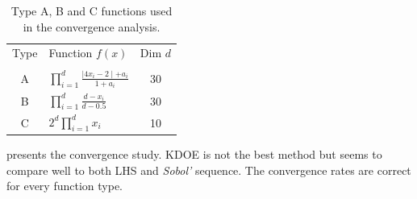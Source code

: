 \begin{table}[!ht]
\centering
\caption{Type A, B and C functions used in the convergence analysis.}
\begin{tabular}{clc}
\toprule
Type &  Function $f(x)$ & Dim $d$\\
 &   &  \\
\midrule %
A & $\displaystyle\prod_{i=1}^d \frac{\mid 4x_i - 2 \mid + a_i}{1 + a_i}$& 30\\
B & $\displaystyle\prod_{i=1}^d \frac{d-x_i}{d-0.5}$ & 30\\
C & $2^d \displaystyle\prod_{i=1}^d x_i$ & 10\\
\bottomrule
\end{tabular}
\label{tab:conv_int}
\end{table}


 presents the convergence study. KDOE is not the best method but seems to compare well to both LHS and \emph{Sobol'} sequence. The convergence rates are correct for every function type.


